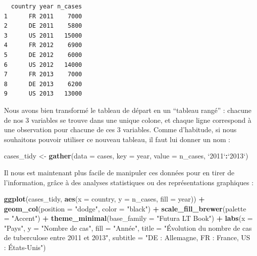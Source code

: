 \documentclass[a4paperpaper,]{article}
\newenvironment{Shaded}{\begin{snugshade}}{\end{snugshade}}
\newcommand{\KeywordTok}[1]{\textcolor[rgb]{0.13,0.29,0.53}{\textbf{#1}}}
\newcommand{\DataTypeTok}[1]{\textcolor[rgb]{0.13,0.29,0.53}{#1}}
\newcommand{\StringTok}[1]{\textcolor[rgb]{0.31,0.60,0.02}{#1}}
\newcommand{\OperatorTok}[1]{\textcolor[rgb]{0.81,0.36,0.00}{\textbf{#1}}}
\newcommand{\NormalTok}[1]{#1}
\theoremstyle{definition}
\theoremstyle{definition}
\theoremstyle{definition}
\theoremstyle{remark}
\begin{document}
\begin{verbatim}
  country year n_cases
1      FR 2011    7000
2      DE 2011    5800
3      US 2011   15000
4      FR 2012    6900
5      DE 2012    6000
6      US 2012   14000
7      FR 2013    7000
8      DE 2013    6200
9      US 2013   13000
\end{verbatim}

Nous avons bien transformé le tableau de départ en un ``tableau rangé''
: chacune de nos 3 variables se trouve dans une unique colone, et chaque
ligne correspond à une observation pour chacune de ces 3 variables.
Comme d'habitude, si nous souhaitons pouvoir utiliser ce nouveau
tableau, il faut lui donner un nom :

\begin{Shaded}
\begin{Highlighting}[]
\NormalTok{cases_tidy <-}\StringTok{ }\KeywordTok{gather}\NormalTok{(}\DataTypeTok{data =}\NormalTok{ cases, }\DataTypeTok{key =}\NormalTok{ year, }\DataTypeTok{value =}\NormalTok{ n_cases, }\StringTok{`}\DataTypeTok{2011}\StringTok{`}\OperatorTok{:}\StringTok{`}\DataTypeTok{2013}\StringTok{`}\NormalTok{)}
\end{Highlighting}
\end{Shaded}

Il nous est maintenant plus facile de manipuler ces données pour en
tirer de l'information, grâce à des analyses statistiques ou des
représentations graphiques :

\begin{Shaded}
\begin{Highlighting}[]
\KeywordTok{ggplot}\NormalTok{(cases_tidy, }\KeywordTok{aes}\NormalTok{(}\DataTypeTok{x =}\NormalTok{ country, }\DataTypeTok{y =}\NormalTok{ n_cases, }\DataTypeTok{fill =}\NormalTok{ year)) }\OperatorTok{+}
\StringTok{  }\KeywordTok{geom_col}\NormalTok{(}\DataTypeTok{position =} \StringTok{"dodge"}\NormalTok{, }\DataTypeTok{color =} \StringTok{"black"}\NormalTok{) }\OperatorTok{+}
\StringTok{  }\KeywordTok{scale_fill_brewer}\NormalTok{(}\DataTypeTok{palette =} \StringTok{"Accent"}\NormalTok{) }\OperatorTok{+}
\StringTok{  }\KeywordTok{theme_minimal}\NormalTok{(}\DataTypeTok{base_family =} \StringTok{"Futura LT Book"}\NormalTok{) }\OperatorTok{+}
\StringTok{  }\KeywordTok{labs}\NormalTok{(}\DataTypeTok{x =} \StringTok{"Pays"}\NormalTok{,}
       \DataTypeTok{y =} \StringTok{"Nombre de cas"}\NormalTok{,}
       \DataTypeTok{fill =} \StringTok{"Année"}\NormalTok{,}
       \DataTypeTok{title =} \StringTok{"Évolution du nombre de cas de tuberculose entre 2011 et 2013"}\NormalTok{,}
       \DataTypeTok{subtitle =} \StringTok{"DE : Allemagne, FR : France, US : États-Unis"}\NormalTok{)}
\end{Highlighting}
\end{Shaded}
\end{document}
